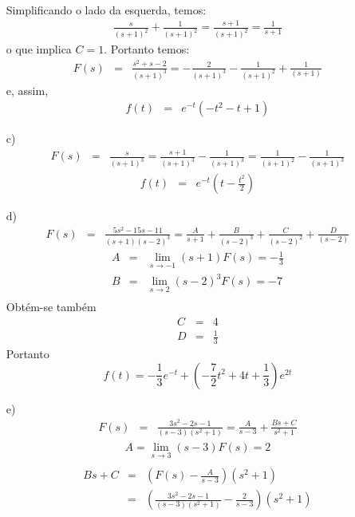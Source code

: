 \begin{resp}
\begin{itemize}
\begin{eqnarray*}
\end{eqnarray*}
Simplificando o lado da esquerda, temos:
\begin{eqnarray*}
\frac{s}{(s+1)^2}+\frac{1}{(s+1)^2}=\frac{s+1}{(s+1)^2}=\frac{1}{s+1}
\end{eqnarray*}
o que implica $C=1$. Portanto temos:
\begin{eqnarray*}
F(s)&=&\frac{s^2+s-2}{(s+1)^3}=-\frac{2}{(s+1)^3}-\frac{1}{(s+1)^2}+\frac{1}{(s+1)}
\end{eqnarray*}
e, assim,
\begin{eqnarray*}
f(t)&=&e^{-t}\left(-t^2-t+1\right)
\end{eqnarray*}
\item [c)]
\begin{eqnarray*}
F(s)&=&\frac{s}{(s+1)^3}=\frac{s+1}{(s+1)^3}-\frac{1}{(s+1)^3}=\frac{1}{(s+1)^2}-\frac{1}{(s+1)^3}
\end{eqnarray*}
\begin{eqnarray*}
f(t)&=&e^{-t}\left(t-\frac{t^2}{2}\right)
\end{eqnarray*}
 \item [d)]
\begin{eqnarray*}
F(s)&=&\frac{5s^2-15s-11}{(s+1)(s-2)^3}=\frac{A}{s+1}+\frac{B}{(s-2)^3}+\frac{C}{(s-2)^2}+\frac{D}{(s-2)}
\end{eqnarray*}
\begin{eqnarray*}
A&=&\lim_{s\to -1}(s+1)F(s)=-\frac{1}{3}\\
B&=&\lim_{s\to 2}(s-2)^3F(s)=-7\\
\end{eqnarray*}
Obtém-se também
\begin{eqnarray*}
C&=&4\\
D&=&\frac{1}{3}
\end{eqnarray*}
Portanto
 \begin{equation}f(t)=-\frac{1}{3}e^{-t}+\left(-\frac{7}{2}t^2+4t+\frac{1}{3}\right)e^{2t}\end{equation}
 \item [e)]
\begin{eqnarray*}
F(s)&=&\frac{3s^2-2s-1}{(s-3)(s^2+1)}=\frac{A}{s-3}+\frac{Bs+C}{s^2+1}
\end{eqnarray*}
\begin{eqnarray*}
A=\lim_{s\to 3}(s-3)F(s)=2\\
\end{eqnarray*}
\begin{eqnarray*}
Bs+C&=&\left(F(s)-\frac{A}{s-3}\right)(s^2+1)\\
&=&\left(\frac{3s^2-2s-1}{(s-3)(s^2+1)}-\frac{2}{s-3}\right)(s^2+1)\\

\end{eqnarray*}
\end{itemize}
\end{resp}
